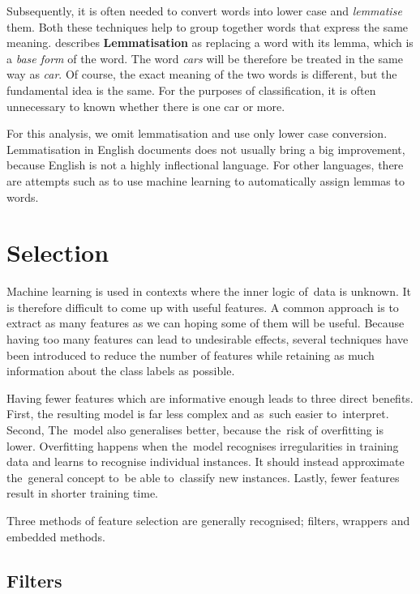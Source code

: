 Subsequently, it is often needed to convert words into lower case and {\it lemmatise} them.
Both these techniques help to group together words that express the same meaning.
\citet{sammut2011encyclopedia} describes
{\bf Lemmatisation} as replacing a word with its lemma, which is a {\it base form} of the word.
The word \textit{cars} will be therefore be treated in the same way as \textit{car}.
Of course, the exact meaning of the two words is different,
but the fundamental idea is the same.
For the purposes of classification, it is often unnecessary to known whether there is one car or more.

For this analysis, we omit lemmatisation and use only lower case conversion.
Lemmatisation in English documents does not usually bring a big improvement,
because English is not a highly inflectional language.
For other languages, there are attempts such as \citet{jurvsic2010lemmagen}
to use machine learning to automatically assign lemmas to words.

\section{Selection}

Machine learning is used in contexts where the inner logic of~data is unknown.
It is therefore difficult to come up with useful features.
A common approach is to extract as many features as we can hoping some of them will be useful.
Because having too many features can lead to undesirable effects,
several techniques have been introduced to reduce the number of features
while retaining as much information about the class labels as possible.

Having fewer features which are informative enough leads to three direct benefits.
First, the resulting model is far less complex and as~such easier to~interpret.
Second, The~model also generalises better, because the~risk of overfitting is lower.
Overfitting happens when the~model recognises irregularities in training data
and learns to recognise individual instances.
It should instead approximate the~general concept to~be able to~classify new instances.
Lastly, fewer features result in shorter training time.

Three methods of feature selection are generally recognised; filters, wrappers and embedded methods.

\subsection{Filters}
\label{subsec:filters}

